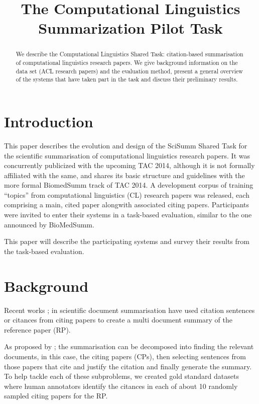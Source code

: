 \documentclass[11pt]{article}
\title{The Computational Linguistics Summarization Pilot Task}
\date{}
\begin{document}
\maketitle
\begin{abstract}
We describe the Computational Linguistics Shared Task: citation-based summarisation of computational linguistics research papers. We give background information on the data set (ACL research papers) and the evaluation method, present a general overview of the systems that have taken part in the task and discuss their preliminary results.
\end{abstract}

\section{Introduction}
This paper describes the evolution and design of the SciSumm Shared Task for the scientific summarisation of computational linguistics research papers. It was concurrently publicized with the upcoming TAC 2014, although it is not formally affiliated with the same, and shares its basic structure and guidelines with the more formal BiomedSumm track of TAC 2014. A development 
corpus of training ``topics'' from computational linguistics (CL) research papers was released, each comprising a main, cited paper alongwith  associated citing papers. Participants were invited to enter their systems  in a task-based evaluation, similar to the one announced by BioMedSumm.

This paper will describe the participating systems and survey their results from the task-based evaluation.

\section{Background}
Recent works \cite{mohammad2009};\cite{abu2011} in scientific document summarisation have used citation sentences or citances from citing  papers to create a multi document summary of the reference paper (RP). 

As proposed by \cite{vu2010}; \cite{hoang2010} the summarisation can be decomposed into finding the relevant documents, in this case, the citing papers (CPs), then selecting sentences from those papers that cite and justify the citation and finally generate the summary. To help tackle each of these subproblems, we created gold standard datasets where human annotators identify the citances in each of about 10 randomly sampled citing papers for the RP.
\end{document}

